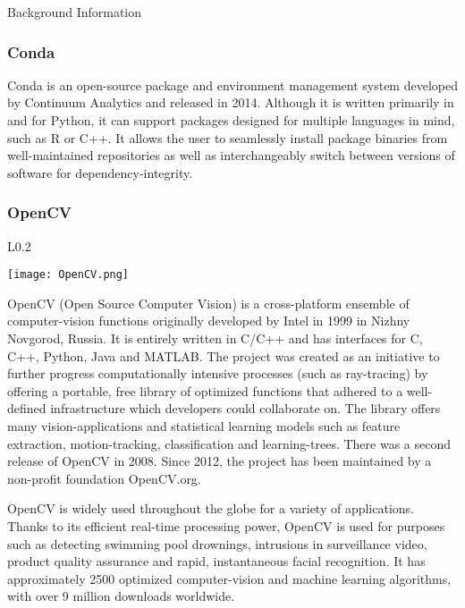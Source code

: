 \documentclass[a4paper,12pt]{article}
\begin{document}
\begin{section}{Background Information}
\subsubsection{Conda}

Conda is an open-source package and environment management system developed by Continuum Analytics and released in 2014. Although it is written primarily in and for Python, it can support packages designed for multiple languages in mind, such as R or C++. It allows the user to seamlessly install package binaries from well-maintained repositories as well as interchangeably switch between versions of software for dependency-integrity. 

\subsubsection{OpenCV}

\begin{wrapfigure}{L}{0.2\textwidth}
\begin{center}
\centering
\texttt{[image: OpenCV.png]}
\end{center}
\end{wrapfigure}


OpenCV (Open Source Computer Vision) is a cross-platform ensemble of computer-vision functions originally developed by Intel in 1999 in Nizhny Novgorod, Russia. It is entirely written in C/C++ and has interfaces for C, C++, Python, Java and MATLAB. The project was created as an initiative to further progress computationally intensive processes (such as ray-tracing) by offering a portable, free library of optimized functions that adhered to a well-defined infrastructure which developers could collaborate on. The library offers many vision-applications and statistical learning models such as feature extraction, motion-tracking, classification and learning-trees. There was a second release of OpenCV in 2008. Since 2012, the project has been maintained by a non-profit foundation OpenCV.org. 

OpenCV is widely used throughout the globe for a variety of applications. Thanks to its efficient real-time processing power, OpenCV is used for purposes such as detecting swimming pool drownings, intrusions in surveillance video, product quality assurance and rapid, instantaneous facial recognition. It has approximately 2500 optimized computer-vision and machine learning algorithms, with over 9 million downloads worldwide. 


\end{section}
\end{document}
